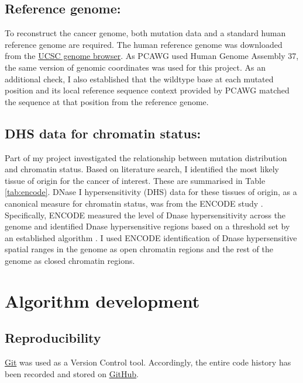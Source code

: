 \subsection{Reference genome:} 
To reconstruct the cancer genome, both mutation data and a standard human reference genome are required. The human reference genome was downloaded from the \href{http://hgdownload.soe.ucsc.edu/goldenPath/hg19/chromosomes}{UCSC genome browser}. As PCAWG used Human Genome Assembly 37, the same version of genomic coordinates was used for this project. As an additional check, I also established that the wildtype base at each mutated position and its local reference sequence context provided by PCAWG matched the sequence at that position from the reference genome. 

\subsection{DHS data for chromatin status:} 
Part of my project investigated the relationship between mutation distribution and chromatin status. Based on literature search, I identified the most likely tissue of origin for the cancer of interest. These are summarised in Table \ref{tab:encode}. DNase I hypersensitivity (DHS) data for these tissues of origin, as a canonical measure for chromatin status, was from the ENCODE study \citep[downloaded from either \href{https://genome.ucsc.edu/cgi-bin/hgFileUi?db=hg19&g=wgEncodeOpenChromDnase}{Duke} or \href{https://genome.ucsc.edu/cgi-bin/hgFileUi?db=hg19&g=wgEncodeUwDnase}{UW};][]{Thurman2012TheGenome,Klemm2019ChromatinEpigenome}. Specifically, ENCODE measured the level of Dnase hypersensitivity across the genome and identified Dnase hypersensitive regions based on a threshold set by an established algorithm \citep{Boyle2008High-ResolutionGenome}. I used ENCODE identification of Dnase hypersensitive spatial ranges in the genome as open chromatin regions and the rest of the genome as closed chromatin regions.

\section{Algorithm development}
\subsection{Reproducibility} 
\href{http://git-scm.com}{Git} was used as a Version Control tool. Accordingly, the entire code history has been recorded and stored on \href{https://github.com}{GitHub}.

